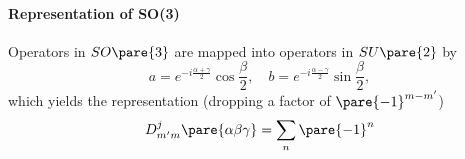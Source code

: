 \documentclass[hidelinks]{article}
\begin{document}

\paragraph{Representation of SO(3)} %
\label{par:representation_of_SO3}

Operators in $SO\pare{3}$ are mapped into operators in $SU\pare{2}$ by
\[ a = e^{-i\frac{\alpha+\gamma}{2}}\cos\frac{\beta}{2},\quad b = e^{-i\frac{\alpha-\gamma}{2}}\sin\frac{\beta}{2}, \]
which yields the representation (dropping  a factor of $\pare{-1}^{m-m'}$)
\[ D^j_{m'm}\pare{\alpha\beta\gamma} = \sum_n \pare{-1}^n \]




\end{document}
